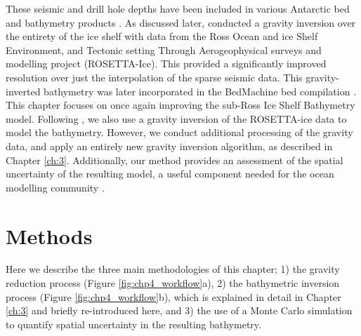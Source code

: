 These seismic and drill hole depths have been included in various Antarctic bed and bathymetry products \citep{fretwellbedmap22013,lebrocqimproved2010, timmermannconsistent2010}. As discussed later, \citet{tintoross2019} conducted a gravity inversion over the entirety of the ice shelf with data from the Ross Ocean and ice Shelf Environment, and Tectonic setting Through Aerogeophysical surveys and modelling project (ROSETTA-Ice). This provided a significantly improved resolution over just the interpolation of the sparse seismic data. This gravity-inverted bathymetry was later incorporated in the BedMachine bed compilation \citep{morlighemdeep2020, morlighemmeasures2022}. This chapter focuses on once again improving the sub-Ross Ice Shelf Bathymetry model. Following \citet{tintoross2019}, we also use a gravity inversion of the ROSETTA-ice data to model the bathymetry. However, we conduct additional processing of the gravity data, and apply an entirely new gravity inversion algorithm, as described in Chapter \ref{ch:3}. Additionally, our method provides an assessment of the spatial uncertainty of the resulting model, a useful component needed for the ocean modelling community \citep{goldbergbathymetric2020}. \\


\section{Methods}

Here we describe the three main methodologies of this chapter; 1) the gravity reduction process (Figure \ref{fig:chp4_workflow}a), 2) the bathymetric inversion process (Figure \ref{fig:chp4_workflow}b), which is explained in detail in Chapter \ref{ch:3} and briefly re-introduced here, and 3) the use of a Monte Carlo simulation to quantify spatial uncertainty in the resulting bathymetry. 

